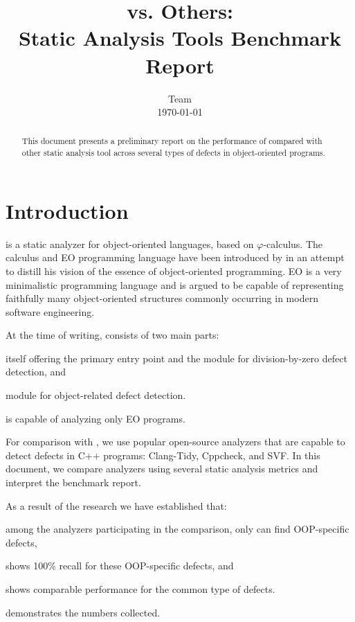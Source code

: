 
\title{\polystat{} vs. Others: \texorpdfstring{\\}{} Static Analysis Tools Benchmark Report}
\author{\polystat{} Team \texorpdfstring{\\}{} \today}%

\begin{abstract}
This document presents a preliminary report on the performance of \polystat{} compared with other static analysis tool across several types of defects in object-oriented programs.
\end{abstract}

\maketitle
\pagestyle{plain}

\section{Introduction}

\polystat{} is a static analyzer for object-oriented languages, based on $\varphi$-calculus. The calculus and EO programming language have been introduced by \citet{eolang-paper} in an attempt to distill his vision of the essence of object-oriented programming. EO is a very minimalistic programming language and is argued to be capable of representing faithfully many object-oriented structures commonly occurring in modern software engineering.

At the time of writing, \polystat{} consists of two main parts:
\begin{inparaenum}[a)]
\item {} itself offering the primary entry point and the module for division-by-zero defect detection, and
\item {} module for object-related defect detection.
\end{inparaenum}
\polystat{} is capable of analyzing only EO programs.

For comparison with \polystat{}, we use popular open-source analyzers that are capable to detect defects in C++ programs: Clang-Tidy, Cppcheck, and SVF. In this document, we compare analyzers using several static analysis metrics and interpret the benchmark report.

As a result of the research we have established that:
\begin{inparaenum}[a)]
    \item among the analyzers participating in the comparison, only \polystat{} can find OOP-specific defects,
    \item \polystat{} shows 100\% recall for these OOP-specific defects,
    and
    \item \polystat{} shows comparable performance for the common type of defects.
\end{inparaenum}
 demonstrates the numbers collected.


